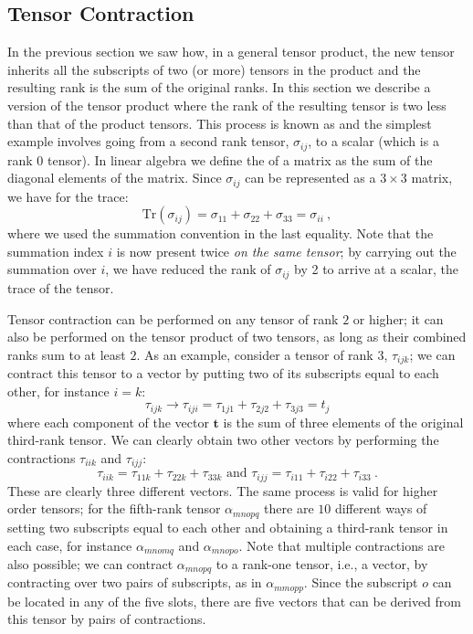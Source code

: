 

\subsection{Tensor Contraction}\label{\chabbr:ssec:tensorcontraction}
In the previous section we saw how, in a general tensor product, the new tensor inherits all the subscripts of two (or more) tensors in the product and the resulting rank is the sum of the original ranks.  In this section we describe a version of the tensor product where the rank of the resulting tensor is two less than that of the product tensors.  This process is known as  and the simplest example involves going from a second rank tensor, $\sigma_{ij}$, to a scalar (which is a rank 0 tensor).  In linear algebra we define the  of a matrix as the sum of the diagonal elements of the matrix.  Since $\sigma_{ij}$ can be represented as a $3\times 3$ matrix, we have for the trace:
\[
	\text{Tr}(\sigma_{ij}) = \sigma_{11}+\sigma_{22}+\sigma_{33} = \sigma_{ii}\ ,
\]
where we used the summation convention in the last equality.  Note that the summation index $i$ is now present twice \textit{on the same tensor}; by carrying out the summation over $i$, we have reduced the rank of $\sigma_{ij}$ by 2 to arrive at a scalar, the trace of the tensor.

Tensor contraction can be performed on any tensor of rank $2$ or higher; it can also be performed on the tensor product of two tensors, as long as their combined ranks sum to at least $2$.  As an example, consider a tensor of rank $3$, $\tau_{ijk}$; we can contract this tensor to a vector by putting two of its subscripts equal to each other, for instance $i=k$:
\[
	\tau_{ijk}\rightarrow \tau_{iji} = \tau_{1j1}+\tau_{2j2}+\tau_{3j3} = t_j
\]
where each component of the vector $\mathbf{t}$ is the sum of three elements of the original third-rank tensor.  We can clearly obtain two other vectors by performing the contractions $\tau_{iik}$ and $\tau_{ijj}$:
\[
	\tau_{iik} = \tau_{11k}+\tau_{22k}+\tau_{33k}\text{ and } \tau_{ijj} = \tau_{i11}+\tau_{i22}+\tau_{i33}\ .
\]
These are clearly three different vectors.  The same process is valid for higher order tensors; for the fifth-rank tensor $\alpha_{mnopq}$ there are $10$ different ways of setting two subscripts equal to each other and obtaining a third-rank tensor in each case, for instance $\alpha_{mnomq}$ and $\alpha_{mnopo}$.  Note that multiple contractions are also possible; we can contract $\alpha_{mnopq}$ to a rank-one tensor, i.e., a vector, by contracting over two pairs of subscripts, as in $\alpha_{mmopp}$.  Since the subscript $o$ can be located in any of  the five slots, there are five vectors that can be derived from this tensor by pairs of contractions.


